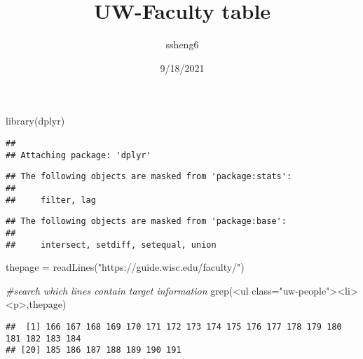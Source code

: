 \documentclass[
]{article}
\title{UW-Faculty table}
\author{ssheng6}
\date{9/18/2021}
\newenvironment{Shaded}{\begin{snugshade}}{\end{snugshade}}
\newcommand{\CommentTok}[1]{\textcolor[rgb]{0.56,0.35,0.01}{\textit{#1}}}
\newcommand{\FunctionTok}[1]{\textcolor[rgb]{0.00,0.00,0.00}{#1}}
\newcommand{\NormalTok}[1]{#1}
\newcommand{\OtherTok}[1]{\textcolor[rgb]{0.56,0.35,0.01}{#1}}
\newcommand{\StringTok}[1]{\textcolor[rgb]{0.31,0.60,0.02}{#1}}
\begin{document}
\maketitle

\begin{Shaded}
\begin{Highlighting}[]
\FunctionTok{library}\NormalTok{(dplyr)}
\end{Highlighting}
\end{Shaded}

\begin{verbatim}
## 
## Attaching package: 'dplyr'
\end{verbatim}

\begin{verbatim}
## The following objects are masked from 'package:stats':
## 
##     filter, lag
\end{verbatim}

\begin{verbatim}
## The following objects are masked from 'package:base':
## 
##     intersect, setdiff, setequal, union
\end{verbatim}

\begin{Shaded}
\begin{Highlighting}[]
\NormalTok{thepage }\OtherTok{=} \FunctionTok{readLines}\NormalTok{(}\StringTok{"https://guide.wisc.edu/faculty/"}\NormalTok{)}

\CommentTok{\#search which lines contain target information}
\FunctionTok{grep}\NormalTok{(}\StringTok{\textquotesingle{}\textless{}ul class="uw{-}people"\textgreater{}\textless{}li\textgreater{}\textless{}p\textgreater{}\textquotesingle{}}\NormalTok{,thepage)}
\end{Highlighting}
\end{Shaded}

\begin{verbatim}
##  [1] 166 167 168 169 170 171 172 173 174 175 176 177 178 179 180 181 182 183 184
## [20] 185 186 187 188 189 190 191
\end{verbatim}
\end{document}
